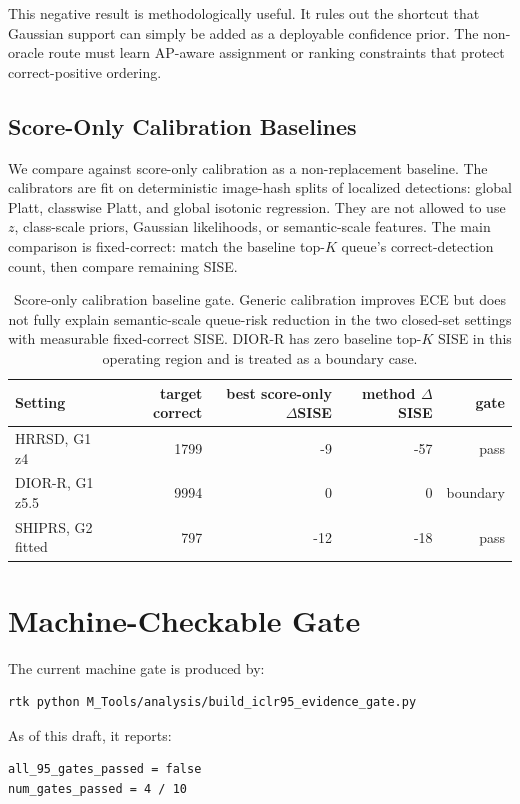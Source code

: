 \documentclass[10pt]{article}
\begin{document}
This negative result is methodologically useful.  It rules out the shortcut
that Gaussian support can simply be added as a deployable confidence prior.
The non-oracle route must learn AP-aware assignment or ranking constraints that
protect correct-positive ordering.

\subsection{Score-Only Calibration Baselines}

We compare against score-only calibration as a non-replacement baseline.  The
calibrators are fit on deterministic image-hash splits of localized detections:
global Platt, classwise Platt, and global isotonic regression.  They are not
allowed to use $z$, class-scale priors, Gaussian likelihoods, or semantic-scale
features.  The main comparison is fixed-correct: match the baseline top-$K$
queue's correct-detection count, then compare remaining SISE.

\begin{table}[h]
\centering
\small
\begin{tabular}{lrrrr}
\toprule
Setting & target correct & best score-only $\Delta$SISE & method $\Delta$SISE & gate \\
\midrule
HRRSD, G1 z4 & 1799 & -9 & -57 & pass \\
DIOR-R, G1 z5.5 & 9994 & 0 & 0 & boundary \\
SHIPRS, G2 fitted & 797 & -12 & -18 & pass \\
\bottomrule
\end{tabular}
\caption{Score-only calibration baseline gate.  Generic calibration improves
ECE but does not fully explain semantic-scale queue-risk reduction in the two
closed-set settings with measurable fixed-correct SISE.  DIOR-R has zero
baseline top-$K$ SISE in this operating region and is treated as a boundary
case.}
\end{table}

\section{Machine-Checkable Gate}

The current machine gate is produced by:
\begin{verbatim}
rtk python M_Tools/analysis/build_iclr95_evidence_gate.py
\end{verbatim}
As of this draft, it reports:
\begin{verbatim}
all_95_gates_passed = false
num_gates_passed = 4 / 10
\end{verbatim}
\end{document}
